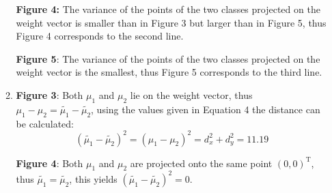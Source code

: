 \documentclass[DIN, pagenumber=false, fontsize=11pt, parskip=half]{scrartcl}
\begin{document}
\begin{enumerate}
\begin{enumerate}[label=\alph*)]
                    \textbf{Figure 4:} The variance of the points of the two classes projected on the weight vector is smaller than in Figure 3 but larger than in Figure 5, thus Figure 4 corresponds to the second line.

                    \textbf{Figure 5}: The variance of the points of the two classes projected on the weight vector is the smallest, thus Figure 5 corresponds to the third line.
                \item 
                    \textbf{Figure 3}: Both $\mu_1$ and $\mu_2$ lie on the weight vector, thus $\mu_1 - \mu_2 = \tilde{\mu_1} - \tilde{\mu_2}$, using the values given in Equation 4 the distance can be calculated:
                    \begin{equation*}
                        {(\tilde{\mu_1} - \tilde{\mu_2})}^2
                            = {(\mu_1 - \mu_2)}^2
                            = d_x^2 + d_y^2
                            = 11.19
                    \end{equation*}

                    \textbf{Figure 4}: Both $\mu_1$ and $\mu_2$ are projected onto the same point ${(0,0)}^\text{T}$, thus $\tilde{\mu_1} = \tilde{\mu_2}$, this yields ${(\tilde{\mu_1} - \tilde{\mu_2})}^2 = 0$.


\end{enumerate}
\end{enumerate}
\end{document}
